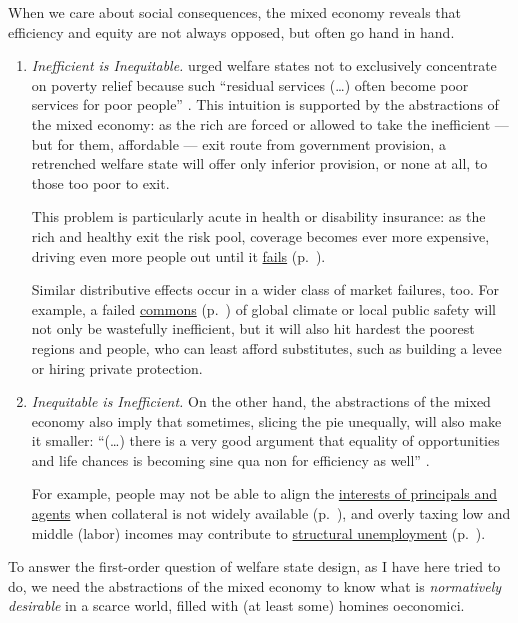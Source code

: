 \begin{enumerate}
	When we care about social consequences, the mixed economy reveals that efficiency and equity are not always opposed, but often go hand in hand.
	\begin{enumerate}
		\item \emph{Inefficient is Inequitable.} \citeauthor{Titmuss1974} urged welfare states not to exclusively concentrate on poverty relief because such ``residual services (\ldots) often become poor services for poor people'' \citeyearpar[134]{Titmuss1974}.
This intuition is supported by the abstractions of the mixed economy:
as the rich are forced or allowed to take the inefficient --- but for them, affordable --- exit route from government provision, a retrenched welfare state will offer only inferior provision, or none at all, to those too poor to exit.

		This problem is particularly acute in health or disability insurance:
as the rich and healthy exit the risk pool, coverage becomes ever more expensive, driving even more people out until it \hyperref[sec:adverse-selection]{fails} (p.~\pageref{sec:adverse-selection}).

		Similar distributive effects occur in a wider class of market failures, too.
For example, a failed \hyperref[sec:common-good]{commons} (p.~\pageref{sec:common-good}) of global climate or local public safety will not only be wastefully inefficient, but it will also hit hardest the poorest regions and people, who can least afford substitutes, such as building a levee or hiring private protection.

		\item \emph{Inequitable is Inefficient.} On the other hand, the abstractions of the mixed economy also imply that sometimes, slicing the pie unequally, will also make it smaller:
``(\ldots) there is a very good argument that equality of opportunities and life chances is becoming sine qua non for efficiency as well'' \citep[ix]{Esping-Andersen2002}.

		For example, people may not be able to align the \hyperref[sec:principal-agent-problem]{interests of principals and agents} when collateral is not widely available (p.~\pageref{sec:principal-agent-problem}), and overly taxing low and middle (labor) incomes may contribute to \hyperref[sec:minimal-DWL]{structural unemployment} (p.~\pageref{sec:minimal-DWL}).
	\end{enumerate}

	To answer the first-order question of welfare state design, as I have here tried to do, we need the abstractions of the mixed economy to know what is \emph{normatively desirable} in a scarce world, filled with (at least some) homines oeconomici.
\end{enumerate}

